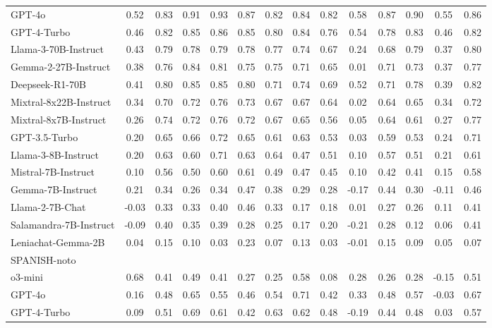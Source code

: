 \begin{table*}[ht]
{\begin{tabular}{lccccccccccccc}
GPT-4o & 0.52 & 0.83 & 0.91 & 0.93 & 0.87 & 0.82 & 0.84 & 0.82 & 0.58 & 0.87 & 0.90 & 0.55 & 0.86 \\
GPT-4-Turbo & 0.46 & 0.82 & 0.85 & 0.86 & 0.85 & 0.80 & 0.84 & 0.76 & 0.54 & 0.78 & 0.83 & 0.46 & 0.82 \\
Llama-3-70B-Instruct & 0.43 & 0.79 & 0.78 & 0.79 & 0.78 & 0.77 & 0.74 & 0.67 & 0.24 & 0.68 & 0.79 & 0.37 & 0.80 \\
Gemma-2-27B-Instruct & 0.38 & 0.76 & 0.84 & 0.81 & 0.75 & 0.75 & 0.71 & 0.65 & 0.01 & 0.71 & 0.73 & 0.37 & 0.77 \\
Deepseek-R1-70B & 0.41 & 0.80 & 0.85 & 0.85 & 0.80 & 0.71 & 0.74 & 0.69 & 0.52 & 0.71 & 0.78 & 0.39 & 0.82 \\
Mixtral-8x22B-Instruct & 0.34 & 0.70 & 0.72 & 0.76 & 0.73 & 0.67 & 0.67 & 0.64 & 0.02 & 0.64 & 0.65 & 0.34 & 0.72 \\
Mixtral-8x7B-Instruct & 0.26 & 0.74 & 0.72 & 0.76 & 0.72 & 0.67 & 0.65 & 0.56 & 0.05 & 0.64 & 0.61 & 0.27 & 0.77 \\
GPT-3.5-Turbo & 0.20 & 0.65 & 0.66 & 0.72 & 0.65 & 0.61 & 0.63 & 0.53 & 0.03 & 0.59 & 0.53 & 0.24 & 0.71 \\
Llama-3-8B-Instruct & 0.20 & 0.63 & 0.60 & 0.71 & 0.63 & 0.64 & 0.47 & 0.51 & 0.10 & 0.57 & 0.51 & 0.21 & 0.61 \\
Mistral-7B-Instruct & 0.10 & 0.56 & 0.50 & 0.60 & 0.61 & 0.49 & 0.47 & 0.45 & 0.10 & 0.42 & 0.41 & 0.15 & 0.58 \\
Gemma-7B-Instruct & 0.21 & 0.34 & 0.26 & 0.34 & 0.47 & 0.38 & 0.29 & 0.28 & -0.17 & 0.44 & 0.30 & -0.11 & 0.46 \\
Llama-2-7B-Chat & -0.03 & 0.33 & 0.33 & 0.40 & 0.46 & 0.33 & 0.17 & 0.18 & 0.01 & 0.27 & 0.26 & 0.11 & 0.41 \\
Salamandra-7B-Instruct & -0.09 & 0.40 & 0.35 & 0.39 & 0.28 & 0.25 & 0.17 & 0.20 & -0.21 & 0.28 & 0.12 & 0.06 & 0.41 \\
Leniachat-Gemma-2B & 0.04 & 0.15 & 0.10 & 0.03 & 0.23 & 0.07 & 0.13 & 0.03 & -0.01 & 0.15 & 0.09 & 0.05 & 0.07 \\
\midrule
SPANISH-noto &&&&&&&&&&&\\
\midrule
o3-mini & 0.68 & 0.41 & 0.49 & 0.41 & 0.27 & 0.25 & 0.58 & 0.08 & 0.28 & 0.26 & 0.28 & -0.15 & 0.51 \\
GPT-4o & 0.16 & 0.48 & 0.65 & 0.55 & 0.46 & 0.54 & 0.71 & 0.42 & 0.33 & 0.48 & 0.57 & -0.03 & 0.67 \\
GPT-4-Turbo & 0.09 & 0.51 & 0.69 & 0.61 & 0.42 & 0.63 & 0.62 & 0.48 & -0.19 & 0.44 & 0.48 & 0.03 & 0.57 \\

\end{tabular}}
\end{table*}
